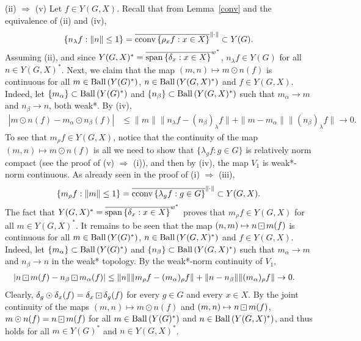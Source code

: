 (ii) $\Rightarrow$ (v)  Let $f\in Y(G,X)$.  Recall that from Lemma~\ref{conv}
and the equivalence of (ii) and (iv),
\[
\{n_\lambda f: \|n\| \leq 1\} = \overline{\operatorname{cconv\,}\{\rho_x f: x\in X\}}^{\|\cdot\|} \subset Y(G).
\]
Assuming (ii), and since $Y(G,X)^* = \overline{\operatorname{span\,}\{\delta_x: x\in X\}}^{w^*}$, $n_\lambda f \in Y(G)$
for all $n\in Y(G,X)^*$.  Next, we claim that the map
$(m,n) \mapsto m\odot n(f)$ is continuous for all $m\in\operatorname{Ball\,}(Y(G)^*)$, $n\in\operatorname{Ball\,}(Y(G,X)^*)$ and
$f\in Y(G,X)$.  Indeed, let $\{m_\alpha\}\subset \operatorname{Ball\,}(Y(G)^*)$ and $\{n_\beta\} \subset \operatorname{Ball\,}(Y(G,X)^*)$
such that $m_\alpha \rightarrow m$ and $n_\beta \rightarrow n$, both weak*.  By (iv),
\begin{align*}
|m\odot n (f) - m_\alpha \odot n_\beta (f)| 
&\leq \|m\|\|n_\lambda f - (n_\beta)_\lambda f\| + \|m - m_\alpha\|\|(n_\beta)_\lambda f\| \rightarrow 0.
\end{align*}
To see that $m_\rho f \in Y(G,X)$, notice that the continuity of the map $(m,n)\mapsto m\odot n(f)$
is all we need to show that
$\{\lambda_g f: g\in G\}$ is relatively norm compact (see the proof of (v) $\Rightarrow$ (i)), and
then by (iv), the map $V_1$ is weak*-norm continuous.
As already seen in the proof of (i) $\Rightarrow$ (iii),
\[
\{m_\rho f: \|m\|\leq 1\} = \overline{\operatorname{cconv\,}\{\lambda_g f: g\in G\}}^{\|\cdot\|} \subset Y(G,X).
\]
The fact that $Y(G,X)^* = \overline{\operatorname{span\,}\{\delta_x: x\in X\}}^{w^*}$ proves that
$m_\rho f \in Y(G,X)$ for all $m\in Y(G,X)^*$.
It remains to be seen that the map
$(n,m) \mapsto n\dotbox m(f)$ is continuous for all $m\in\operatorname{Ball\,}(Y(G)^*)$, $n\in\operatorname{Ball\,}(Y(G,X)^*)$ and
$f\in Y(G,X)$.  Indeed, let $\{m_\alpha\}\subset \operatorname{Ball\,}(Y(G)^*)$ and $\{n_\beta\} \subset \operatorname{Ball\,}(Y(G,X)^*)$
such that $m_\alpha \rightarrow m$ and $n_\beta \rightarrow n$ in the  weak* topology.
By the weak*-norm continuity of $V_1$,
\begin{align*}
|n\dotbox m (f) - n_\beta \dotbox m_\alpha (f)| &\leq \|n\|\|m_\rho f - (m_\alpha)_\rho f\|
 + \|n-n_\beta\|\|(m_\alpha)_\rho f\| \rightarrow 0.
\end{align*}
Clearly, $\delta_g \odot \delta_x(f) = \delta_x \dotbox \delta_g (f)$ for every $g\in G$ and every $x\in X$.
By the joint continuity of the maps $(m,n) \mapsto m\odot n(f)$ and $(m,n) \mapsto n\dotbox m(f)$,
$m\odot n(f) = n\dotbox m(f)$ for all $m\in \operatorname{Ball\,}(Y(G)^*)$ and $n\in \operatorname{Ball\,}(Y(G,X)^*)$, and thus holds for all
$m\in Y(G)^*$ and $n\in Y(G,X)^*$.

